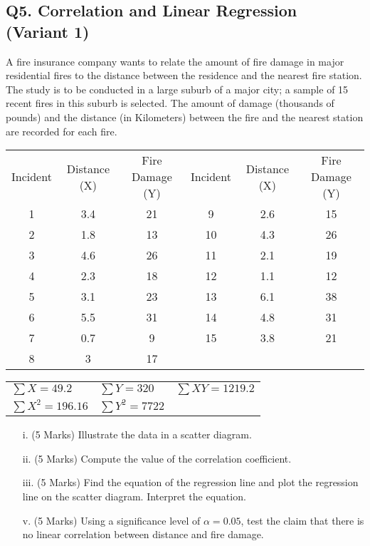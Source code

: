 \documentclass[a4paper,12pt]{article}
\begin{document}
\subsection*{Q5. Correlation and Linear Regression (Variant 1)}
A fire insurance company wants to relate the amount of fire damage in major residential fires to the distance between the residence and the nearest fire station. The study is to be conducted in a large suburb of a major city; a sample of 15 recent fires in this suburb is selected. The amount of damage (thousands of pounds) and the distance (in Kilometers) between the fire and the nearest station are recorded for each fire.

\begin{center}
\begin{tabular}{|c|c|c|c|c|c|}
  \hline
Incident	&	Distance (X) 	&	Fire Damage (Y)   	&	Incident	&	Distance (X) 	& Fire Damage (Y)   		 \\
1	&	3.4	&	21	&	9	&	2.6	&	15	\\
2	&	1.8	&	13	&	10	&	4.3	&	26	\\
3	&	4.6	&	26	&	11	&	2.1	&	19	\\
4	&	2.3	&	18	&	12	&	1.1	&	12	\\
5	&	3.1	&	23	&	13	&	6.1	&	38	\\
6	&	5.5	&	31	&	14	&	4.8	&	31	\\
7	&	0.7	&	9	&	15	&	3.8	&	21	\\
8	&	3	&	17	&		&		&		\\

  \hline
\end{tabular}



\begin{tabular}{lll}
  $\sum X = 49.2$ & $\sum Y = 320$ & $\sum XY = 1219.2$ \\
  $\sum X^2 = 196.16$ & $\sum Y^2 = 7722$ &  \\
 \end{tabular}
 \end{center}


\begin{itemize}
\item[i.](5 Marks) Illustrate the data in a scatter diagram.
\item[ii.](5 Marks) Compute the value of the correlation coefficient.
\item[iii.](5 Marks) Find the equation of the regression line and plot the regression line on the scatter  diagram. Interpret the equation. 	
\item[v.](5 Marks) Using a significance level of $\alpha = 0.05$, test the claim that there is no linear correlation between distance and fire damage. 		
\end{itemize}
\end{document}
